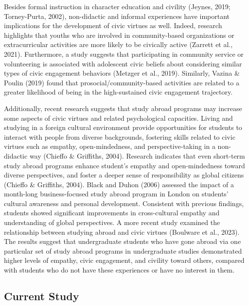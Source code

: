 \documentclass[
  man,
  floatsintext,
  longtable,
  nolmodern,
  notxfonts,
  notimes,
  colorlinks=true,linkcolor=blue,citecolor=blue,urlcolor=blue]{apa7}
\begin{document}
Besides formal instruction in character education and civility (Jeynes,
2019; Torney-Purta, 2002), non-didactic and informal experiences have
important implications for the development of civic virtues as well.
Indeed, research highlights that youths who are involved in
community-based organizations or extracurricular activities are more
likely to be civically active (Zarrett et al., 2021). Furthermore, a
study suggests that participating in community service or volunteering
is associated with adolescent civic beliefs about considering similar
types of civic engagement behaviors (Metzger et al., 2019). Similarly,
Vazina \& Poulin (2019) found that prosocial/community-based activities
are related to a greater likelihood of being in the high-sustained civic
engagement trajectory.

Additionally, recent research suggests that study abroad programs may
increase some aspects of civic virtues and related psychological
capacities. Living and studying in a foreign cultural environment
provide opportunities for students to interact with people from diverse
backgrounds, fostering skills related to civic virtues such as empathy,
open-mindedness, and perspective-taking in a non-didactic way (Chieffo
\& Griffiths, 2004). Research indicates that even short-term study
abroad programs enhance student's empathy and open-mindedness toward
diverse perspectives, and foster a deeper sense of responsibility as
global citizens (Chieffo \& Griffiths, 2004). Black and Duhon (2006)
assessed the impact of a month-long business-focused study abroad
program in London on students' cultural awareness and personal
development. Consistent with previous findings, students showed
significant improvements in cross-cultural empathy and understanding of
global perspectives. A more recent study examined the relationship
between studying abroad and civic virtues (Boulware et al., 2023). The
results suggest that undergraduate students who have gone abroad via one
particular set of study abroad programs in undergraduate studies
demonstrated higher levels of empathy, civic engagement, and civility
toward others, compared with students who do not have these experiences
or have no interest in them.

\subsection{Current Study}\label{current-study}
\end{document}
